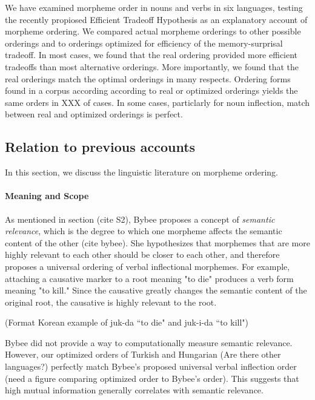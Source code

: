 \documentclass[11pt,letterpaper]{article}
\newcommand\becky[1]{{\color{blue}(#1)}}
\begin{document}
We have examined morpheme order in nouns and verbs in six languages, testing the recently propiosed Efficient Tradeoff Hypothesis \citep{hahn2020modeling} as an explanatory account of morpheme ordering.
We compared actual morpheme orderings to other possible orderings and to orderings optimized for efficiency of the memory-surprisal tradeoff.
In most cases, we found that the real ordering provided more efficient tradeoffs than most alternative orderings.
More importantly, we found that the real orderings match the optimal orderings in many respects.
Ordering forms found in a corpus according according to real or optimized orderings yields the same orders in XXX of cases.
In some cases, particlarly for noun inflection, match between real and optimized orderings is perfect.

\subsection{Relation to previous accounts}


In this section, we discuss the linguistic literature on morpheme ordering.

\paragraph{Meaning and Scope}
As mentioned in section \becky{cite S2}, Bybee proposes a concept of \textit{semantic relevance}, which is the degree to which one morpheme affects the semantic content of the other \becky{cite bybee}. She hypothesizes that morphemes that are more highly relevant to each other should be closer to each other, and therefore proposes a universal ordering of verbal inflectional morphemes. For example, attaching a causative marker to a root meaning "to die" produces a verb form meaning "to kill." Since the causative greatly changes the semantic content of the original root, the causative is highly relevant to the root. 

\becky{Format Korean example of juk-da ``to die" and juk-i-da ``to kill"}

Bybee did not provide a way to computationally measure semantic relevance. However, our optimized orders of Turkish and Hungarian \becky{Are there other languages?} perfectly match Bybee's proposed universal verbal inflection order \becky{need a figure comparing optimized order to Bybee's order}. This suggests that high mutual information generally correlates with semantic relevance. 
\end{document}
